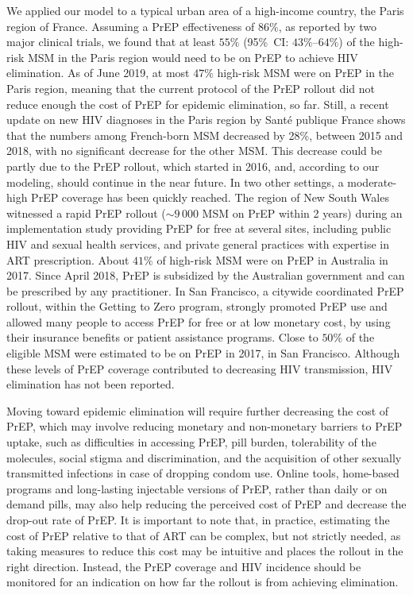 \documentclass[preprint,review,12pt]{article}			%
\begin{document}
We applied our model to a typical urban area of a high-income country, the Paris region of France. Assuming a PrEP effectiveness of $86\%$, as reported by two major clinical trials, we found that at least $55\%$ (95\%~CI: $43\%$--$64\%$) of the high-risk MSM in the Paris region would need to be on PrEP to achieve HIV elimination. As of June 2019, at most $47\%$ high-risk MSM were on PrEP in the Paris region, meaning that the current protocol of the PrEP rollout did not reduce enough the cost of PrEP for epidemic elimination, so far. Still, a recent update on new HIV diagnoses in the Paris region \cite{SPF2019} by Sant\'e publique France shows that the numbers among French-born MSM decreased by 28\%, between 2015 and 2018, with no significant decrease for the other MSM. This decrease could be partly due to the PrEP rollout, which started in 2016, and, according to our modeling, should continue in the near future. In two other settings, a moderate-high PrEP coverage has been quickly reached. The region of New South Wales witnessed a rapid PrEP rollout ($\sim 9\,000$ MSM on PrEP within 2 years) during an implementation study providing PrEP for free at several sites, including public HIV and sexual health services, and private general practices with expertise in ART prescription.\cite{Grulich2018} About $41\%$ of high-risk MSM were on PrEP in Australia in 2017.\cite{Kirby2020} Since April 2018, PrEP is subsidized by the Australian government and can be prescribed by any practitioner.\cite{ASHM2018} In San Francisco, a citywide coordinated PrEP rollout, within the Getting to Zero program, strongly promoted PrEP use and allowed many people to access PrEP for free or at low monetary cost, by using their insurance benefits or patient assistance programs. Close to $50\%$ of the eligible MSM were estimated to be on PrEP in 2017, in San Francisco.\cite{SFO_2017} Although these levels of PrEP coverage contributed to decreasing HIV transmission,\cite{Grulich2018,SFO_2017,Smith2020} HIV elimination has not been reported. 

Moving toward epidemic elimination will require further decreasing the cost of PrEP, which may involve reducing monetary and non-monetary barriers to PrEP uptake, such as difficulties in accessing PrEP, pill burden, tolerability of the molecules, social stigma and discrimination, and the acquisition of other sexually transmitted infections in case of dropping condom use.\cite{Gilson2018,Thomann2017,Brooks2019} Online tools,\cite{SFZero} home-based programs\cite{Siegler2019} and long-lasting injectable versions of PrEP,\cite{Marshall2018} rather than daily or on demand pills, may also help reducing the perceived cost of PrEP and decrease the drop-out rate of PrEP. It is important to note that, in practice, estimating the cost of PrEP relative to that of ART can be complex, but not strictly needed, as taking measures to reduce this cost may be intuitive and places the rollout in the right direction. Instead, the PrEP coverage and HIV incidence should be monitored for an indication on how far the rollout is from achieving elimination.
\end{document}
